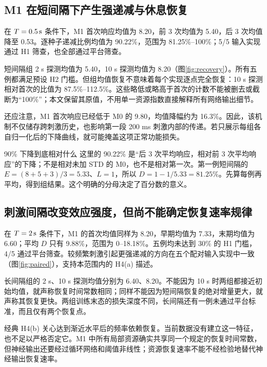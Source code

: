 \subsection{M1 在短间隔下产生强递减与休息恢复}
在 $T=0.5\,\mathrm{s}$ 条件下，M1 首次响应均值为 8.20，前 3 次均值为 5.40，后 3 次均值降至 0.53。逐种子递减比例均值为 90.22\%，范围为 81.25\%--100\%；5/5 输入实现通过 H1 筛查，也全部通过平台筛查。

短间隔组 2 s 探测均值为 5.40，10 s 探测均值为 8.20（图\ref{fig:recovery}）。所有五例都满足预设 H2 门槛。但组均值恢复不意味着每个实现逐点完全恢复：10 s 探测相对首次的比值为 87.5\%--112.5\%。这些略低或略高于首次的计数不能被删去或截断为“100\%”；本文保留其原值，不用单一资源指数直接解释所有网络输出细节。

还应注意，M1 首次响应已经低于 M0 的 9.80，均值降幅约为 16.3\%。因此，该机制不仅储存跨刺激历史，也影响第一段 200 ms 刺激内部的传递。若只展示每组各自归一化后的下降曲线，就可能掩盖这项正常功能损失。

\begin{primer}{90\% 下降到底相对什么}
这里的 90.22\% 是“后 3 次平均响应，相对前 3 次平均响应”的下降；不是相对未加 STD 的 M0，也不是相对第一次。第一例短间隔的 $E=(8+5+3)/3=5.33$、$L=1$，所以 $D=1-1/5.33=81.25\%$。先算每例再平均，得到组结果。这个明确的分母决定了百分数的意义。
\end{primer}



\subsection{刺激间隔改变效应强度，但尚不能确定恢复速率规律}
在 $T=2\,\mathrm{s}$ 条件下，M1 的首次均值同样为 8.20，早期均值为 7.33，末期均值为 6.60；平均 $D$ 只有 9.88\%，范围为 0--18.18\%。五例均未达到 30\% 的 H1 门槛，4/5 通过平台筛查。较频繁刺激引起更强递减的方向在五个配对输入实现中一致（图\ref{fig:paired}），支持本范围内的 H4(a) 描述。

长间隔组的 2 s、10 s 探测均值分别为 6.40、8.20。不能因为 10 s 时两组都接近初始均值，就声称恢复时间常数相同；同样不能因为短间隔恢复的绝对增量更大，就声称其恢复更快。两组训练末态的损失深度不同，长间隔还有一例未通过平台标准，而且仅有两个恢复点。

经典 H4(b) 关心达到渐近水平后的频率依赖恢复。当前数据没有建立这一特征，也不足以严格否定它。M1 中所有局部资源确实共享同一个规定的恢复时间常数，但神经输出还要经过循环网络和阈值非线性；资源恢复速率不能不经检验地替代神经输出恢复速率。




